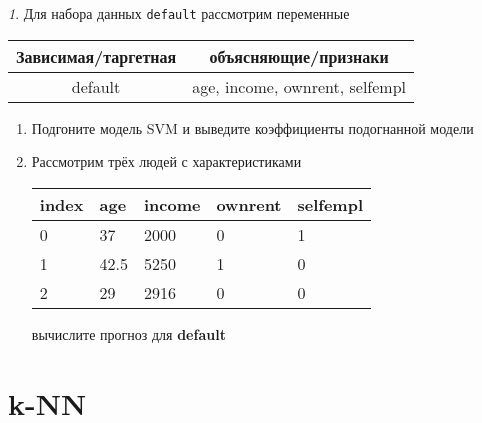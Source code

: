 \documentclass[12pt]{article}
\theoremstyle{remark}
\newtheorem{exercise}{}[section]
\begin{document}
\begin{exercise}
Для набора данных \texttt{default} рассмотрим переменные

\begin{center}
	\begin{tabular}{|c|c|} \hline
		Зависимая/таргетная & объясняющие/признаки \\ \hline
		default & age, income, ownrent, selfempl \\ \hline
	\end{tabular}
\end{center}

\begin{enumerate}
	\item Подгоните модель SVM и выведите коэффициенты подогнанной модели
	\item Рассмотрим трёх людей с характеристиками
	\begin{center}
		\begin{tabular}{|l||l|l|l|l|}\hline
			index & age & income & ownrent & selfempl  \\ \hline\hline
			0 & 37 & 2000 & 0 & 1  \\
			1 & 42.5 & 5250 & 1 & 0  \\
			2 & 29 & 2916 & 0 & 0  \\ \hline
		\end{tabular}
	\end{center}
	вычислите прогноз для \textbf{default} 
\end{enumerate}
\end{exercise}
	

\section{k-NN}
\end{document}
